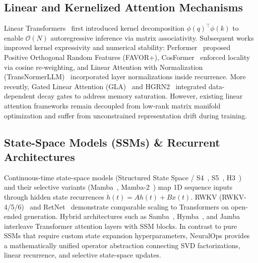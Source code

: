 \subsection{Linear and Kernelized Attention Mechanisms}
Linear Transformers~\cite{katharopoulos2020transformers} first introduced kernel decomposition $\phi(q)^\top \phi(k)$ to enable $\mathcal{O}(N)$ autoregressive inference via matrix associativity. Subsequent works improved kernel expressivity and numerical stability: Performer~\cite{choromanski2020rethinking} proposed Positive Orthogonal Random Features (FAVOR+), CosFormer~\cite{qin2022cosformer} enforced locality via cosine re-weighting, and Linear Attention with Normalization (TransNormerLLM)~\cite{qin2024lightning} incorporated layer normalizations inside recurrence. More recently, Gated Linear Attention (GLA)~\cite{yang2023gated} and HGRN2~\cite{qin2024hgrn2} integrated data-dependent decay gates to address memory saturation. However, existing linear attention frameworks remain decoupled from low-rank matrix manifold optimization and suffer from unconstrained representation drift during training.

\subsection{State-Space Models (SSMs) \& Recurrent Architectures}
Continuous-time state-space models (Structured State Space / S4~\cite{gu2021efficient}, S5~\cite{smith2022simplified}, H3~\cite{fu2022hungry}) and their selective variants (Mamba~\cite{gu2023mamba}, Mamba-2~\cite{dao2024transformers}) map 1D sequence inputs through hidden state recurrences $\dot{h}(t) = A h(t) + B x(t)$. RWKV (RWKV-4/5/6)~\cite{peng2023rwkv} and RetNet~\cite{sun2023retentive} demonstrate comparable scaling to Transformers on open-ended generation. Hybrid architectures such as Samba~\cite{ren2024samba}, Hymba~\cite{dong2024hymba}, and Jamba~\cite{lieber2024jamba} interleave Transformer attention layers with SSM blocks. In contrast to pure SSMs that require custom state expansion hyperparameters, NeuralOps provides a mathematically unified operator abstraction connecting SVD factorizations, linear recurrence, and selective state-space updates.

